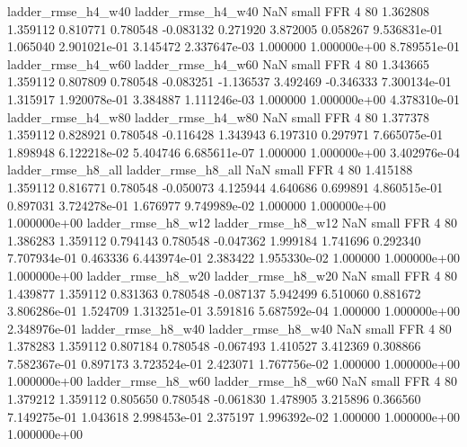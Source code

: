       ladder_rmse_h4_w40       ladder_rmse_h4_w40                   NaN      small      FFR                 4 80 1.362808       1.359112 0.810771       0.780548   -0.083132      0.271920      3.872005     0.058267   9.536831e-01  1.065040 2.901021e-01     3.145472   2.337647e-03            1.000000    1.000000e+00        8.789551e-01
      ladder_rmse_h4_w60       ladder_rmse_h4_w60                   NaN      small      FFR                 4 80 1.343665       1.359112 0.807809       0.780548   -0.083251     -1.136537      3.492469    -0.346333   7.300134e-01  1.315917 1.920078e-01     3.384887   1.111246e-03            1.000000    1.000000e+00        4.378310e-01
      ladder_rmse_h4_w80       ladder_rmse_h4_w80                   NaN      small      FFR                 4 80 1.377378       1.359112 0.828921       0.780548   -0.116428      1.343943      6.197310     0.297971   7.665075e-01  1.898948 6.122218e-02     5.404746   6.685611e-07            1.000000    1.000000e+00        3.402976e-04
      ladder_rmse_h8_all       ladder_rmse_h8_all                   NaN      small      FFR                 4 80 1.415188       1.359112 0.816771       0.780548   -0.050073      4.125944      4.640686     0.699891   4.860515e-01  0.897031 3.724278e-01     1.676977   9.749989e-02            1.000000    1.000000e+00        1.000000e+00
      ladder_rmse_h8_w12       ladder_rmse_h8_w12                   NaN      small      FFR                 4 80 1.386283       1.359112 0.794143       0.780548   -0.047362      1.999184      1.741696     0.292340   7.707934e-01  0.463336 6.443974e-01     2.383422   1.955330e-02            1.000000    1.000000e+00        1.000000e+00
      ladder_rmse_h8_w20       ladder_rmse_h8_w20                   NaN      small      FFR                 4 80 1.439877       1.359112 0.831363       0.780548   -0.087137      5.942499      6.510060     0.881672   3.806286e-01  1.524709 1.313251e-01     3.591816   5.687592e-04            1.000000    1.000000e+00        2.348976e-01
      ladder_rmse_h8_w40       ladder_rmse_h8_w40                   NaN      small      FFR                 4 80 1.378283       1.359112 0.807184       0.780548   -0.067493      1.410527      3.412369     0.308866   7.582367e-01  0.897173 3.723524e-01     2.423071   1.767756e-02            1.000000    1.000000e+00        1.000000e+00
      ladder_rmse_h8_w60       ladder_rmse_h8_w60                   NaN      small      FFR                 4 80 1.379212       1.359112 0.805650       0.780548   -0.061830      1.478905      3.215896     0.366560   7.149275e-01  1.043618 2.998453e-01     2.375197   1.996392e-02            1.000000    1.000000e+00        1.000000e+00
